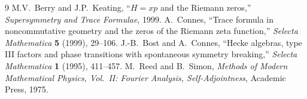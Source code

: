 \documentclass[11pt,a4paper]{article}
\begin{document}
\begin{thebibliography}{9}
 M.V.\ Berry and J.P.\ Keating,
  ``$H = xp$ and the Riemann zeros,''
  \emph{Supersymmetry and Trace Formulae}, 1999.
 A.\ Connes, ``Trace formula in noncommutative geometry and
  the zeros of the Riemann zeta function,''
  \emph{Selecta Mathematica} \textbf{5} (1999), 29--106.
 J.-B.\ Bost and A.\ Connes, ``Hecke algebras, type III
  factors and phase transitions with spontaneous symmetry breaking,''
  \emph{Selecta Mathematica} \textbf{1} (1995), 411--457.
 M.\ Reed and B.\ Simon, \emph{Methods of Modern
  Mathematical Physics, Vol.\ II: Fourier Analysis, Self-Adjointness},
  Academic Press, 1975.
\end{thebibliography}
\end{document}
